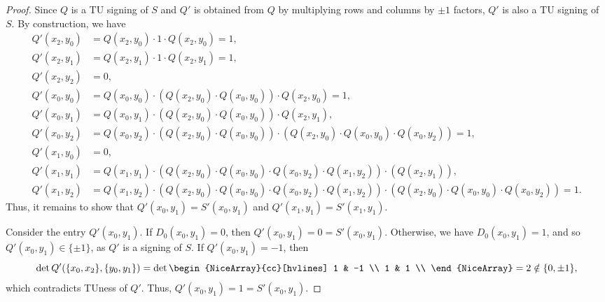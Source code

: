 \begin{proof}
    Since $Q$ is a TU signing of $S$ and $Q'$ is obtained from $Q$ by multiplying rows and columns by $\pm 1$ factors, $Q'$ is also a TU signing of $S$. By construction, we have
    \begin{align*}
        Q' (x_{2}, y_{0}) &= Q (x_{2}, y_{0}) \cdot 1 \cdot Q (x_{2}, y_{0}) = 1, \\
        Q' (x_{2}, y_{1}) &= Q (x_{2}, y_{1}) \cdot 1 \cdot Q (x_{2}, y_{1}) = 1, \\
        Q' (x_{2}, y_{2}) &= 0, \\
        Q' (x_{0}, y_{0}) &= Q (x_{0}, y_{0}) \cdot (Q (x_{2}, y_{0}) \cdot Q (x_{0}, y_{0})) \cdot Q (x_{2}, y_{0}) = 1, \\
        Q' (x_{0}, y_{1}) &= Q (x_{0}, y_{1}) \cdot (Q (x_{2}, y_{0}) \cdot Q (x_{0}, y_{0})) \cdot Q (x_{2}, y_{1}), \\
        Q' (x_{0}, y_{2}) &= Q (x_{0}, y_{2}) \cdot (Q (x_{2}, y_{0}) \cdot Q (x_{0}, y_{0})) \cdot (Q (x_{2}, y_{0}) \cdot Q (x_{0}, y_{0}) \cdot Q (x_{0}, y_{2})) = 1, \\
        Q' (x_{1}, y_{0}) &= 0, \\
        Q' (x_{1}, y_{1}) &= Q (x_{1}, y_{1}) \cdot (Q (x_{2}, y_{0}) \cdot Q (x_{0}, y_{0}) \cdot Q (x_{0}, y_{2}) \cdot Q (x_{1}, y_{2})) \cdot (Q (x_{2}, y_{1})), \\
        Q' (x_{1}, y_{2}) &= Q (x_{1}, y_{2}) \cdot (Q (x_{2}, y_{0}) \cdot Q (x_{0}, y_{0}) \cdot Q (x_{0}, y_{2}) \cdot Q (x_{1}, y_{2})) \cdot (Q (x_{2}, y_{0}) \cdot Q (x_{0}, y_{0}) \cdot Q (x_{0}, y_{2})) = 1.
    \end{align*}
    Thus, it remains to show that $Q' (x_{0}, y_{1}) = S' (x_{0}, y_{1})$ and $Q' (x_{1}, y_{1}) = S' (x_{1}, y_{1})$.

    Consider the entry $Q' (x_{0}, y_{1})$. If $D_{0} (x_{0}, y_{1}) = 0$, then $Q' (x_{0}, y_{1}) = 0 = S' (x_{0}, y_{1})$. Otherwise, we have $D_{0} (x_{0}, y_{1}) = 1$, and so $Q' (x_{0}, y_{1}) \in \{\pm 1\}$, as $Q'$ is a signing of $S$. If $Q' (x_{0}, y_{1}) = -1$, then
    \[
        \det Q' (\{x_{0}, x_{2}\}, \{y_{0}, y_{1}\}) = \det \begin{NiceArray}{cc}[hvlines] 1 & -1 \\ 1 & 1 \\ \end{NiceArray} = 2 \notin \{0, \pm 1\},
    \]
    which contradicts TUness of $Q'$. Thus, $Q' (x_{0}, y_{1}) = 1 = S' (x_{0}, y_{1})$.


\end{proof}
